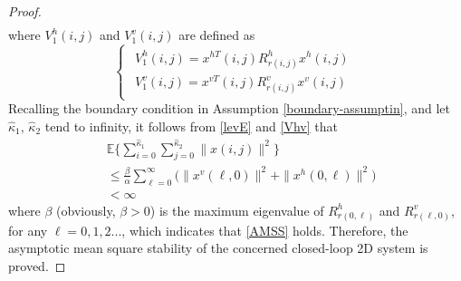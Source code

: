 \documentclass[journal,final,twocolumn]{IEEEtran}
\begin{document}
\begin{proof}
\begin{equation}
\begin{split}
		\end{split}
	\end{equation} 
	where $V_{1}^{h}(i,j)$ and $V_{1}^{v}(i,j)$ are defined as   
	\begin{equation*}
	\left\{
	\begin{array}{lr}
	\begin{split}
	V^{h}_{1}(i,j)=x^{hT}(i,j)R^{h}_{r(i,j)}x^{h}(i,j)\\
	V^{v}_{1}(i,j)=x^{vT}(i,j)R^{v}_{r(i,j)}x^{v}(i,j)
	\end{split}
	\end{array}
	\right.
	\end{equation*}
	Recalling the boundary condition in Assumption \ref{boundary-assumptin}, and let $\hat{\kappa}_{1}$, $\hat{\kappa}_{2}$ tend to infinity, it follows from \eqref{levE} and \eqref{Vhv} that
	\begin{equation}
		\begin{split}
		&\mathbb{E}\Big\{\sum_{i=0}^{\hat{\kappa}_{1}}\sum_{j=0}^{\hat{\kappa}_{2}}  \|x(i,j)\|^{2} \Big\} \\
		&\leq \frac{\beta}{\alpha} \sum_{\ell=0}^{\infty} \big(  \|x^{v}(\ell,0)\|^{2} + \|x^{h}(0,\ell)\|^{2} \big)\\
		&<\infty
		\end{split}	
	\end{equation}
	where $\beta$ (obviously, $\beta>0$) is the maximum eigenvalue of $R^{h}_{r(0,\ell)}$ and $R^{v}_{r(\ell,0)}$, for any $\ell=0,1,2...$, which indicates that \eqref{AMSS} holds. Therefore, the asymptotic mean square stability of the concerned closed-loop  2D system is proved. 
	

\end{proof}
\end{document}
